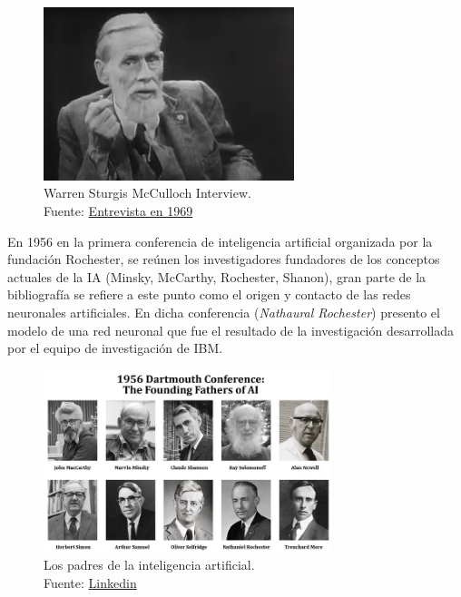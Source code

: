 \begin{figure}[H]
    \centering
    \includegraphics[width=0.65\textwidth]{figures/Warren Sturgis McCulloch Interview.png}
    \caption{Warren Sturgis McCulloch Interview.\\Fuente: \href{https://www.youtube.com/watch?v=8Wdz1Tj5084}{Entrevista en 1969}}
    \label{fig:Warren Sturgis McCulloch}
\end{figure}


En 1956 en la primera conferencia de inteligencia artificial organizada por la fundación {Rochester}, se reúnen los investigadores fundadores de los conceptos actuales de la IA ({Minsky, McCarthy, Rochester, Shanon}), gran parte de la bibliografía se refiere a este punto como el origen y contacto de las redes neuronales artificiales.
En dicha conferencia (\textit{Nathaural Rochester}) presento el modelo de una red neuronal que fue el resultado de la investigación desarrollada por el equipo de investigación de IBM.

\begin{figure}[H]
    \centering
    \includegraphics[width=0.75\textwidth]{figures/conferecia 1956 - 1689170718524.png}
    \caption{Los padres de la inteligencia artificial.\\Fuente: \href{https://www.linkedin.com/pulse/first-ever-ai-conference-tracing-evolution-history-ofai-nicky-verd}{Linkedin}}
    \label{fig:conferencia-1956}
\end{figure}

